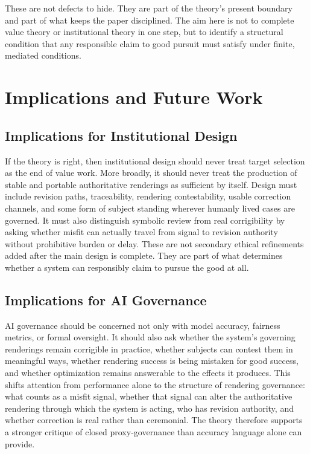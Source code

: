 \documentclass[11pt]{article}
\begin{document}
These are not defects to hide. They are part of the theory's present boundary and part of what keeps the paper disciplined. The aim here is not to complete value theory or institutional theory in one step, but to identify a structural condition that any responsible claim to good pursuit must satisfy under finite, mediated conditions.
\section{Implications and Future Work}

\subsection{Implications for Institutional Design}

If the theory is right, then institutional design should never treat target selection as the end of value work. More broadly, it should never treat the production of stable and portable authoritative renderings as sufficient by itself. Design must include revision paths, traceability, rendering contestability, usable correction channels, and some form of subject standing wherever humanly lived cases are governed. It must also distinguish symbolic review from real corrigibility by asking whether misfit can actually travel from signal to revision authority without prohibitive burden or delay.\cite{MoynihanHerdHarvey2015AdministrativeBurden} These are not secondary ethical refinements added after the main design is complete. They are part of what determines whether a system can responsibly claim to pursue the good at all.

\subsection{Implications for AI Governance}

AI governance should be concerned not only with model accuracy, fairness metrics, or formal oversight. It should also ask whether the system's governing renderings remain corrigible in practice, whether subjects can contest them in meaningful ways, whether rendering success is being mistaken for good success, and whether optimization remains answerable to the effects it produces. This shifts attention from performance alone to the structure of rendering governance: what counts as a misfit signal, whether that signal can alter the authoritative rendering through which the system is acting, who has revision authority, and whether correction is real rather than ceremonial.\cite{LepriEtAl2018FairTransparentAccountableADM} The theory therefore supports a stronger critique of closed proxy-governance than accuracy language alone can provide.
\end{document}
